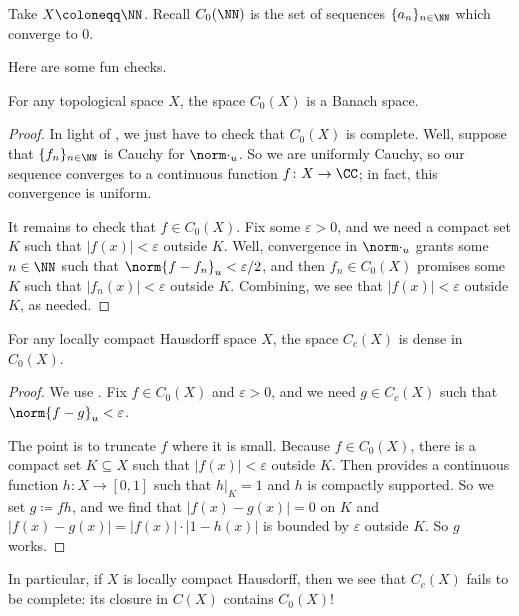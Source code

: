 \documentclass[../notes.tex]{subfiles}
\begin{document}
\begin{example}
	Take $X\coloneqq\NN$. Recall $C_0(\NN)$ is the set of sequences $\{a_n\}_{n\in\NN}$ which converge to $0$.
\end{example}
Here are some fun checks.
\begin{proposition} \label{prop:co-banach}
	For any topological space $X$, the space $C_0(X)$ is a Banach space.
\end{proposition}
\begin{proof}
	In light of , we just have to check that $C_0(X)$ is complete. Well, suppose that $\{f_n\}_{n\in\NN}$ is Cauchy for $\norm\cdot_u$. So we are uniformly Cauchy, so our sequence converges to a continuous function $f\colon X\to\CC$; in fact, this convergence is uniform.
	
	It remains to check that $f\in C_0(X)$. Fix some $\varepsilon>0$, and we need a compact set $K$ such that $\left|f(x)\right|<\varepsilon$ outside $K$. Well, convergence in $\norm\cdot_u$ grants some $n\in\NN$ such that $\norm{f-f_n}_u<\varepsilon/2$, and then $f_n\in C_0(X)$ promises some $K$ such that $\left|f_n(x)\right|<\varepsilon$ outside $K$. Combining, we see that $\left|f(x)\right|<\varepsilon$ outside $K$, as needed.
\end{proof}
\begin{proposition} \label{prop:closure-of-cc}
	For any locally compact Hausdorff space $X$, the space $C_c(X)$ is dense in $C_0(X)$.
\end{proposition}
\begin{proof}
	We use . Fix $f\in C_0(X)$ and $\varepsilon>0$, and we need $g\in C_c(X)$ such that $\norm{f-g}_u<\varepsilon$.

	The point is to truncate $f$ where it is small. Because $f\in C_0(X)$, there is a compact set $K\subseteq X$ such that $\left|f(x)\right|<\varepsilon$ outside $K$. Then  provides a continuous function $h\colon X\to[0,1]$ such that $h|_K=1$ and $h$ is compactly supported. So we set $g\coloneqq fh$, and we find that $\left|f(x)-g(x)\right|=0$ on $K$ and $\left|f(x)-g(x)\right|=\left|f(x)\right|\cdot\left|1-h(x)\right|$ is bounded by $\varepsilon$ outside $K$. So $g$ works.
\end{proof}
\begin{remark}
	In particular, if $X$ is locally compact Hausdorff, then we see that $C_c(X)$ fails to be complete: its closure in $C(X)$ contains $C_0(X)$!
\end{remark}
\end{document}
